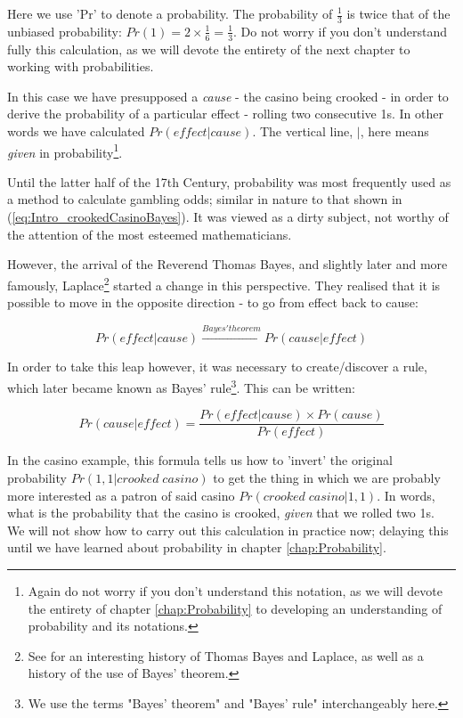 \documentclass[11pt,fullpage]{book}
\begin{document}
Here we use 'Pr' to denote a probability. The probability of $\frac{1}{3}$ is twice that of the unbiased probability: $Pr(1) = 2\times\frac{1}{6} = \frac{1}{3}$. Do not worry if you don't understand fully this calculation, as we will devote the entirety of the next chapter to working with probabilities.

In this case we have presupposed a \textit{cause} - the casino being crooked - in order to derive the probability of a particular effect - rolling two consecutive 1s. In other words we have calculated $Pr(effect|cause)$. The vertical line, $|$, here means \textit{given} in probability\footnote{Again do not worry if you don't understand this notation, as we will devote the entirety of chapter \ref{chap:Probability} to developing an understanding of probability and its notations.}. 

Until the latter half of the 17th Century, probability was most frequently used as a method to calculate gambling odds; similar in nature to that shown in (\ref{eq:Intro_crookedCasinoBayes}). It was viewed as a dirty subject, not worthy of the attention of the most esteemed mathematicians.

However, the arrival of the Reverend Thomas Bayes, and slightly later and more famously, Laplace\footnote{See \cite{mcgrayne2011theory} for an interesting history of Thomas Bayes and Laplace, as well as a history of the use of Bayes' theorem.} started a change in this perspective. They realised that it is possible to move in the opposite direction - to go from effect back to cause:

\begin{equation}
Pr(effect|cause) \xrightarrow{Bayes' theorem} Pr(cause|effect)
\end{equation}

In order to take this leap however, it was necessary to create/discover a rule, which later became known as Bayes' rule\footnote{We use the terms "Bayes' theorem" and "Bayes' rule" interchangeably here.}. This can be written:

\begin{equation}\label{eq:Intro_BayesRuleCauseEffect}
Pr(cause|effect) = \frac{Pr(effect|cause)\times Pr(cause)}{Pr(effect)}
\end{equation}

In the casino example, this formula tells us how to 'invert' the original probability $Pr(1,1|crooked\;casino)$ to get the thing in which we are probably more interested as a patron of said casino $Pr(crooked\;casino|1,1)$. In words, what is the probability that the casino is crooked, \textit{given} that we rolled two 1s. We will not show how to carry out this calculation in practice now; delaying this until we have learned about probability in chapter \ref{chap:Probability}.
\end{document}
